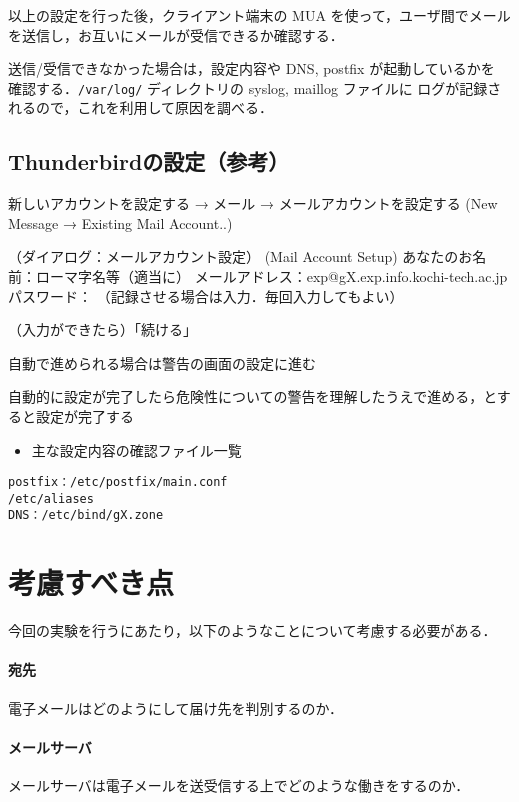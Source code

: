 以上の設定を行った後，クライアント端末の MUA を使って，ユーザ間でメール
を送信し，お互いにメールが受信できるか確認する．

送信/受信できなかった場合は，設定内容や DNS, postfix が起動しているかを
確認する．\texttt{/var/log/} ディレクトリの syslog, maillog ファイルに
ログが記録されるので，これを利用して原因を調べる．

\subsection*{Thunderbirdの設定（参考）}

\begin{cli}
新しいアカウントを設定する → メール → メールアカウントを設定する
(New Message → Existing Mail Account..)

（ダイアログ：メールアカウント設定）
  (Mail Account Setup)
あなたのお名前：ローマ字名等（適当に）
メールアドレス：exp@gX.exp.info.kochi-tech.ac.jp
パスワード： （記録させる場合は入力．毎回入力してもよい）

（入力ができたら）「続ける」

自動で進められる場合は警告の画面の設定に進む

自動的に設定が完了したら危険性についての警告を理解したうえで進める，とすると設定が完了する
\end{cli}

\begin{itemize}
\item 主な設定内容の確認ファイル一覧
\end{itemize}

\begin{center}
\begin{breakbox}
\begin{alltt}
postfix   ：  /etc/postfix/main.conf
              /etc/aliases
DNS       ：  /etc/bind/gX.zone
\end{alltt}
\end{breakbox}
\end{center}

\section{考慮すべき点}
今回の実験を行うにあたり，以下のようなことについて考慮する必要がある．
\paragraph{宛先} 電子メールはどのようにして届け先を判別するのか．
\paragraph{メールサーバ} メールサーバは電子メールを送受信する上でどのような働きをするのか．

